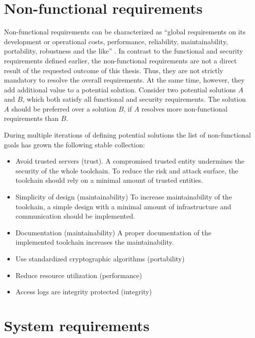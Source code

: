 \documentclass[../main.tex]{subfiles}
\begin{document}
\section{Non-functional requirements}\label{non-functional-requriements}
Non-functional requirements can be characterized as \enquote{global requirements on its development or operational costs, performance, reliability, maintainability, portability, robustness and the like} \cite[11]{Mylopoulos1992}.
In contrast to the functional and security requirements defined earlier, the non-functional requirements are not a direct result of the requested outcome of this thesis.
Thus, they are not strictly mandatory to resolve the overall requirements.
At the same time, however, they add additional value to a potential solution.
Consider two potential solutions $A$ and $B$, which both satisfy all functional and security requirements.
The solution $A$ should be preferred over a solution $B$, if $A$ resolves more non-functional requirements than $B$.

During multiple iterations of defining potential solutions the list of non-functional goals has grown the following stable collection:

\begin{itemize}
    \item Avoid trusted servers (trust). 
    A compromised trusted entity undermines the security of the whole toolchain. 
    To reduce the risk and attack surface, the toolchain should rely on a minimal amount of trusted entities.
    \item Simplicity of design (maintainability)
    To increase maintainability of the toolchain, a simple design with a minimal amount of infrastructure and communication should be implemented.
    \item Documentation (maintainability)
    A proper documentation of the implemented toolchain increases the maintainability.
    \item Use standardized cryptographic algorithms (portability)
    \item Reduce resource utilization (performance)
    \item Access logs are integrity protected (integrity)
\end{itemize}


\section{System requirements}\label{system-requriements}
\end{document}
